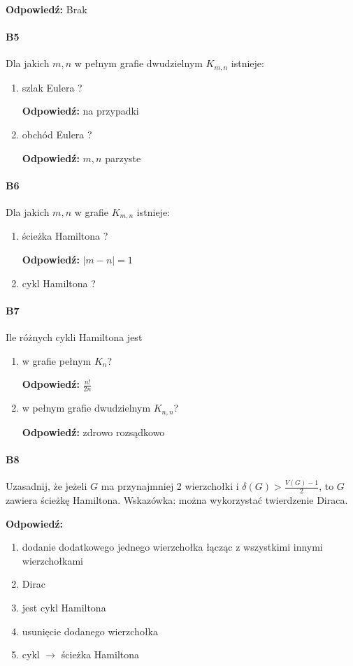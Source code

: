 \textbf{Odpowiedź: }Brak
\paragraph{B5} Dla jakich $m, n$ w pełnym grafie dwudzielnym $K_{m,n}$ istnieje:
\begin{enumerate}[label=\alph*)]
\item szlak Eulera ?

\textbf{Odpowiedź: }na przypadki
\item obchód Eulera ?

\textbf{Odpowiedź: }$m,n$ parzyste
\end{enumerate}

\paragraph{B6} Dla jakich $m, n$ w grafie $K_{m,n}$ istnieje:
\begin{enumerate}[label=\alph*)]
\item ścieżka Hamiltona ?

\textbf{Odpowiedź: }$|m-n|=1$
\item cykl Hamiltona ?
\end{enumerate}


\paragraph{B7} Ile różnych cykli Hamiltona jest
\begin{enumerate}[label=\alph*)]
\item w grafie pełnym $K_n$?

\textbf{Odpowiedź: }$\frac{n!}{2n}$
\item w pełnym grafie dwudzielnym $K_{n,n}$?

\textbf{Odpowiedź: }zdrowo rozsądkowo 
\end{enumerate}

\paragraph{B8} Uzasadnij, że jeżeli $G$ ma przynajmniej 2 wierzchołki i $\delta (G) > \frac{V(G) - 1}{2}$, to $G$ zawiera ścieżkę Hamiltona. Wskazówka: można wykorzystać twierdzenie Diraca.

\textbf{Odpowiedź: }
\begin{enumerate}
\item dodanie dodatkowego jednego wierzchołka łącząc z wszystkimi innymi wierzchołkami
\item Dirac
\item jest cykl Hamiltona
\item usunięcie dodanego wierzchołka
\item cykl $\rightarrow$ ścieżka Hamiltona
\end{enumerate}
